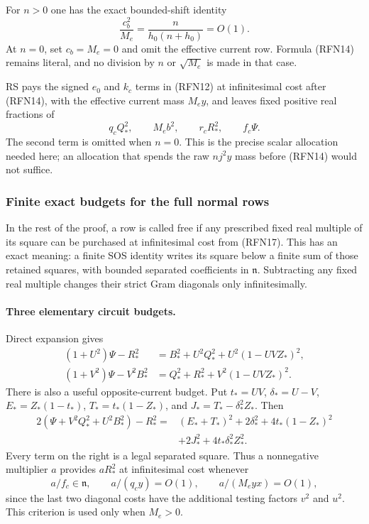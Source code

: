 For $n>0$ one has the exact bounded-shift identity
\[
 \frac{c_b^2}{M_e}=\frac{n}{h_0(n+h_0)}=O(1).
                                                               \tag{RFN16}
\]
At $n=0$, set $c_b=M_e=0$ and omit the effective current row.  Formula
(RFN14) remains literal, and no division by $n$ or $\sqrt{M_e}$ is
made in that case.

RS pays the signed $e_0$ and $k_c$ terms in (RFN12) at infinitesimal
cost after (RFN14), with the effective current mass $M_e y$, and leaves
fixed positive real fractions of
\[
 q_cQ_*^2,\qquad M_e b^2,\qquad r_cR_*^2,\qquad f_c\Psi. \tag{RFN17}
\]
The second term is omitted when $n=0$.  This is the precise scalar
allocation needed here; an allocation that spends the raw $nj^2y$
mass before (RFN14) would not suffice.

\subsubsection*{Finite exact budgets for the full normal rows}

In the rest of the proof, a row is called free if any prescribed fixed
real multiple of its square can be purchased at infinitesimal cost
from (RFN17).  This has an exact meaning: a finite SOS identity writes
its square below a finite sum of those retained squares, with bounded
separated coefficients in $\mathfrak n$.  Subtracting any fixed real
multiple changes their strict Gram diagonals only infinitesimally.

\paragraph{Three elementary circuit budgets.}
Direct expansion gives
\begin{align}
 (1+U^2)\Psi-R_*^2
     &=B_*^2+U^2Q_*^2+U^2(1-UVZ_*)^2,                  \tag{RFN18a}\\
 (1+V^2)\Psi-V^2B_*^2
     &=Q_*^2+R_*^2+V^2(1-UVZ_*)^2.                   \tag{RFN18b}
\end{align}
There is also a useful opposite-current budget.  Put
$t_*=UV$, $\delta_*=U-V$, $E_*=Z_*(1-t_*)$,
$T_*=t_*(1-Z_*)$, and $J_*=T_*-\delta_*^2Z_*$.  Then
\begin{align}
 2(\Psi+V^2Q_*^2+U^2B_*^2)-R_*^2
 ={}&(E_*+T_*)^2+2\delta_*^2+4t_*(1-Z_*)^2\\
   &+2J_*^2+4t_*\delta_*^2Z_*^2.                      \tag{RFN18c}
\end{align}
Every term on the right is a legal separated square.  Thus a
nonnegative multiplier $a$ provides $aR_*^2$ at infinitesimal cost whenever
\[
 a/f_c\in\mathfrak n,\qquad a/(q_cy)=O(1),\qquad
 a/(M_e yx)=O(1),                                      \tag{RFN18d}
\]
since the last two diagonal costs have the additional testing factors
$v^2$ and $u^2$.  This criterion is used only when $M_e>0$.

